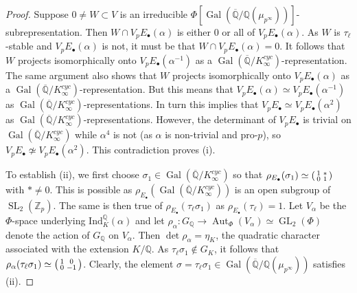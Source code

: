 \documentclass[a4paper,10pt]{amsart}
\numberwithin{equation}{section}
\numberwithin{equation}{section}
\theoremstyle{plain}
\theoremstyle{definition}
\theoremstyle{definition}
\theoremstyle{plain}
\theoremstyle{plain}
\theoremstyle{plain}
\theoremstyle{plain}
\newcommand{\Gal}{\operatorname{Gal}}
\newcommand{\Q}{\mathbb{Q}}
\newcommand{\Zp}{\mathbb{Z}_{p}}
\DeclareMathOperator{\SL}{SL}
\DeclareMathOperator{\GL}{GL}
\DeclareMathOperator{\Aut}{Aut}
\begin{document}
\begin{proof}
{Suppose $0\neq W \subset V$ is an irreducible $\Phi[\Gal(\overline{\Q}/\Q(\mu_{p^\infty}))]$-subrepresentation.  
Then $W \cap V_pE_\bullet(\alpha)$ is either $0$ or all of $V_pE_\bullet(\alpha)$. As $W$ is $\tau_\ell$-stable and $V_pE_\bullet(\alpha)$ is not, it must
be that $W\cap V_pE_\bullet(\alpha) = 0$. It follows that $W$ projects isomorphically onto $V_pE_\bullet(\alpha^{-1})$ as 
a $\Gal(\overline{\Q}/K_\infty^{cyc})$-representation. The same argument also shows that $W$ projects isomorphically onto $V_pE_\bullet(\alpha)$ as 
a $\Gal(\overline{\Q}/K_\infty^{cyc})$-representation.  But this means that $V_pE_\bullet(\alpha)\simeq V_pE_\bullet(\alpha^{-1})$ as 
$\Gal(\overline{\Q}/K_\infty^{cyc})$-representations. In turn this implies that $V_pE_\bullet \simeq V_pE_\bullet(\alpha^2)$ as 
$\Gal(\overline{\Q}/K_\infty^{cyc})$-representations. However, the determinant of $V_pE_\bullet$ is trivial on $\Gal(\overline{\Q}/K_\infty^{cyc})$
while $\alpha^4$ is not (as $\alpha$ is non-trivial and pro-$p$), so $V_pE_\bullet \not\simeq V_pE_\bullet(\alpha^2)$. This contradiction proves (i).

To establish (ii), we first choose $\sigma_1\in \Gal(\overline{\Q}/K_\infty^{cyc})$ so that 
$\rho_{E_\bullet}(\sigma_1) \simeq \left(\smallmatrix 1 & * \\ 0 & 1 \endsmallmatrix\right)$ with $*\neq 0$. This is possible
as $\rho_{E_\bullet}(\Gal(\overline{\Q}/K_\infty^{cyc}))$ is an open subgroup of $\SL_2(\Zp)$. The same is then 
true of $\rho_{E_\bullet}(\tau_\ell\sigma_1)$ as $\rho_{E_\bullet}(\tau_\ell) = 1$. 
Let $V_\alpha$ be the $\Phi$-space underlying $\mathrm{Ind}_K^\Q(\alpha)$ and let $\rho_\alpha: G_\Q\rightarrow \Aut_\Phi(V_\alpha) \simeq \GL_2(\Phi)$ denote
the action of $G_\Q$ on $V_\alpha$. Then $\det\rho_\alpha = \eta_K$, the quadratic character associated with the extension $K/\Q$.
As $\tau_\ell\sigma_1 \not\in G_K$, it follows that $\rho_\alpha(\tau_\ell\sigma_1) \simeq \left(\smallmatrix 1 & 0 \\ 0 & -1 \endsmallmatrix\right)$.
Clearly, the element $\sigma = \tau_\ell\sigma_1\in \Gal(\overline{\Q}/\Q(\mu_{p^\infty}))$ satisfies (ii).
}
\end{proof}
\end{document}
